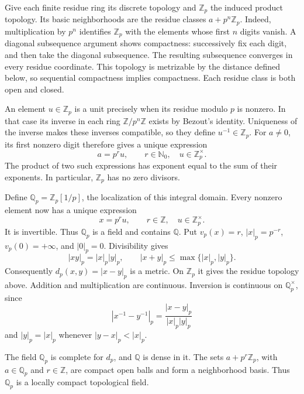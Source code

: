 Give each finite residue ring its discrete topology and \(\mathbb Z_p\) the induced
product topology. Its basic neighborhoods are the residue classes
\(a+p^n\mathbb Z_p\). Indeed, multiplication by \(p^n\) identifies \(\mathbb Z_p\)
with the elements whose first \(n\) digits vanish.
A diagonal subsequence argument shows compactness: successively fix each
digit, and then take the diagonal subsequence. The resulting subsequence
converges in every residue coordinate. This topology is metrizable by the
distance defined below, so sequential compactness implies compactness.
Each residue class is both open and closed.

An element \(u\in\mathbb Z_p\) is a unit precisely when its residue modulo \(p\)
is nonzero. In that case its inverse in each ring \(\mathbb Z/p^n\mathbb Z\)
exists by Bezout's identity. Uniqueness of the inverse makes these inverses
compatible, so they define \(u^{-1}\in\mathbb Z_p\).
For \(a\neq0\), its first nonzero digit therefore gives a unique expression
\[
 a=p^r u,\qquad r\in\mathbb N_0,\quad u\in\mathbb Z_p^\times.
\]
The product of two such expressions has exponent equal to the sum of their
exponents. In particular, \(\mathbb Z_p\) has no zero divisors.

Define \(\mathbb Q_p=\mathbb Z_p[1/p]\), the localization of this integral domain.
Every nonzero element now has a unique expression
\begin{equation}
 x=p^r u,\qquad r\in\mathbb Z,\quad u\in\mathbb Z_p^\times.
 \label{eq:adeles-valuation-decomposition}
\end{equation}
It is invertible. Thus \(\mathbb Q_p\) is a field and contains \(\mathbb Q\).
Put \(v_p(x)=r\), \(|x|_p=p^{-r}\), \(v_p(0)=+\infty\), and
\(|0|_p=0\). Divisibility gives
\[
 |xy|_p=|x|_p|y|_p,\qquad
 |x+y|_p\leq\max\{|x|_p,|y|_p\}.
\]
Consequently \(d_p(x,y)=|x-y|_p\) is a metric. On \(\mathbb Z_p\) it gives the
residue topology above. Addition and multiplication are continuous.
Inversion is continuous on \(\mathbb Q_p^\times\), since
\[
 |x^{-1}-y^{-1}|_p=\frac{|x-y|_p}{|x|_p|y|_p}
\]
and \(|y|_p=|x|_p\) whenever \(|y-x|_p<|x|_p\).

\begin{proposition}
\label{prop:adeles-completion}
The field \(\mathbb Q_p\) is complete for \(d_p\), and \(\mathbb Q\) is dense
in it. The sets \(a+p^r\mathbb Z_p\), with \(a\in\mathbb Q_p\) and \(r\in\mathbb Z\),
are compact open balls and form a neighborhood basis.
Thus \(\mathbb Q_p\) is a locally compact topological field.
\end{proposition}

